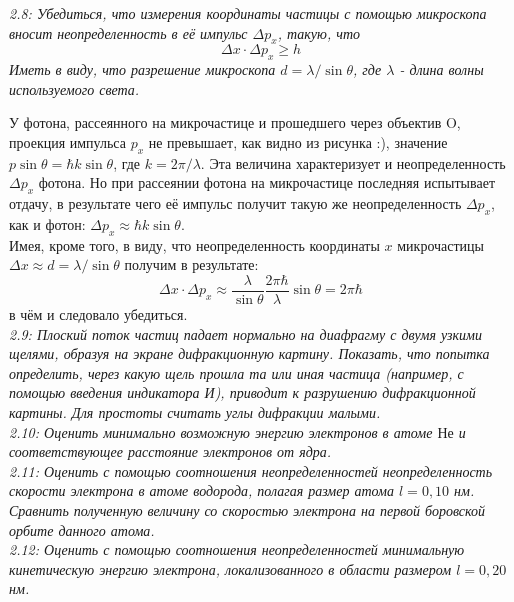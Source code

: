 	\emph{2.8: Убедиться, что измерения координаты частицы с помощью 
		микроскопа вносит неопределенность в её импульс \( \Delta p_x \), 
		такую, что \[ \Delta x\cdot\Delta p_x \geq h \] Иметь в виду, 
		что разрешение микроскопа \( d = \lambda/\sin\theta \), 
		где \( \lambda \) - длина волны используемого света.}

        У фотона, рассеянного на микрочастице и прошедшего через 
        объектив O, проекция импульса \( p_x \) не превышает, как 
        видно из рисунка :), значение 
        \( p\sin\theta = \hbar k\sin\theta \), где 
        \( k = 2\pi/\lambda \). Эта величина характеризует и 
        неопределенность \( \Delta p_x \) фотона. Но при рассеянии 
        фотона на микрочастице последняя испытывает отдачу, в 
        результате чего её импульс получит такую же неопределенность 
        \( \Delta p_x \), как и фотон: 
        \( \Delta p_x \approx \hbar k\sin\theta \). \\
        Имея, кроме того, в виду, что неопределенность координаты 
        \( x \) микрочастицы \( \Delta x \approx d = \lambda/\sin\theta \) 
        получим в результате: 
        \[ 
            \Delta x\cdot\Delta p_x \approx \frac{\lambda}{\sin\theta}
            \frac{2\pi\hbar}{\lambda}\sin\theta = 2\pi\hbar
        \]
        в чём и следовало убедиться.\\

    \emph{2.9: Плоский поток частиц падает нормально на диафрагму 
       	с двумя узкими щелями, образуя на экране дифракционную 
       	картину. Показать, что попытка определить, через какую 
       	щель прошла та или иная частица (например, с помощью 
       	введения индикатора И), приводит к разрушению дифракционной 
       	картины. Для простоты считать углы дифракции малыми.}\\

    \emph{2.10: Оценить минимально возможную энергию электронов 
       	в атоме \( Не \) и соответствующее расстояние электронов 
       	от ядра.}\\

    \emph{2.11: Оценить с помощью соотношения неопределенностей 
       	неопределенность скорости электрона в атоме водорода, 
       	полагая размер атома \( l = 0,10 \) нм. Сравнить полученную 
       	величину со скоростью электрона на первой боровской 
       	орбите данного атома.}\\

    \emph{2.12: Оценить с помощью соотношения неопределенностей 
       	минимальную кинетическую энергию электрона, локализованного 
       	в области размером \( l = 0,20 \) нм.}\\

